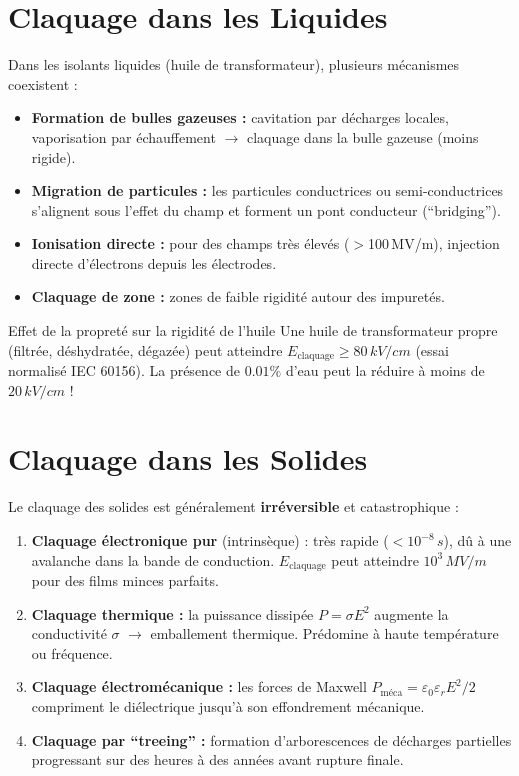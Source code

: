 \documentclass[12pt, a4paper, twoside]{report}
\begin{document}
\section{Claquage dans les Liquides}

Dans les isolants liquides (huile de transformateur), plusieurs mécanismes coexistent :

\begin{itemize}
  \item \textbf{Formation de bulles gazeuses :} cavitation par décharges locales, vaporisation
    par échauffement $\rightarrow$ claquage dans la bulle gazeuse (moins rigide).
  \item \textbf{Migration de particules :} les particules conductrices ou semi-conductrices
    s'alignent sous l'effet du champ et forment un pont conducteur (``bridging'').
  \item \textbf{Ionisation directe :} pour des champs très élevés ($>$100\,MV/m), injection
    directe d'électrons depuis les électrodes.
  \item \textbf{Claquage de zone :} zones de faible rigidité autour des impuretés.
\end{itemize}

\begin{infobox}{Effet de la propreté sur la rigidité de l'huile}
Une huile de transformateur propre (filtrée, déshydratée, dégazée) peut atteindre
$E_{\text{claquage}} \geq 80\,\si{kV/cm}$ (essai normalisé IEC 60156).
La présence de $0.01\%$ d'eau peut la réduire à moins de $20\,\si{kV/cm}$ !
\end{infobox}

\section{Claquage dans les Solides}

Le claquage des solides est généralement \textbf{irréversible} et catastrophique :

\begin{enumerate}
  \item \textbf{Claquage électronique pur} (intrinsèque) : très rapide ($< 10^{-8}\,\si{s}$),
    dû à une avalanche dans la bande de conduction. $E_{\text{claquage}}$ peut atteindre
    $10^3\,\si{MV/m}$ pour des films minces parfaits.
  \item \textbf{Claquage thermique :} la puissance dissipée $P = \sigma E^2$ augmente
    la conductivité $\sigma$ $\rightarrow$ emballement thermique. Prédomine à haute
    température ou fréquence.
  \item \textbf{Claquage électromécanique :} les forces de Maxwell $P_{\text{méca}} = \varepsilon_0\varepsilon_r E^2/2$
    compriment le diélectrique jusqu'à son effondrement mécanique.
  \item \textbf{Claquage par ``treeing'' :} formation d'arborescences de décharges
    partielles progressant sur des heures à des années avant rupture finale.
\end{enumerate}
\end{document}
